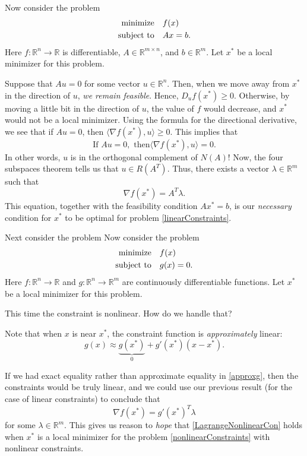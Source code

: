 \documentclass{article}
\DeclareMathOperator*{\minimize}{minimize}
\begin{document}
Now consider the problem
\begin{align}
\label{linearConstraints} \minimize & \quad f(x) \\
\notag \text{subject to} & \quad Ax = b.
\end{align}
Here $f:\mathbb R^n \to \mathbb R$ is differentiable, $A \in \mathbb R^{m \times n}$, and $b \in \mathbb R^m$.
Let $x^*$ be a local minimizer for this problem.

Suppose that $Au = 0$ for some vector $u \in \mathbb R^n$.  Then,
when we move away from $x^*$ in the direction of $u$, \emph{we remain feasible}.
Hence, $D_u f(x^*) \geq 0$.  Otherwise, by moving a little bit in the direction of $u$,
the value of $f$ would decrease, and $x^*$ would not be a local minimizer.
Using the formula for the directional derivative, we see that
if $Au = 0$, then $\langle \nabla f(x^*), u \rangle \geq 0$.
This implies that 
\begin{equation*}
\text{If } Au = 0, \text{ then} \langle \nabla f(x^*), u \rangle = 0.
\end{equation*}
In other words, $u$ is in the orthogonal complement of $N(A)$!
Now, the four subspaces theorem tells us that
$u \in R(A^T)$.  Thus, there exists a vector $\lambda \in \mathbb R^m$ such that
\begin{equation}
\label{LagrangeLinCon} \nabla f(x^*) = A^T \lambda.
\end{equation}
This equation, together with the feasibility condition $Ax^* = b$,
is our \emph{necessary} condition for $x^*$ to be optimal for problem \eqref{linearConstraints}.

Next consider the problem 
Now consider the problem
\begin{align}
\label{nonlinearConstraints} \minimize & \quad f(x) \\
\notag \text{subject to} & \quad g(x) = 0.
\end{align}
Here $f:\mathbb R^n \to \mathbb R$ and $g:\mathbb R^n \to \mathbb R^m$ are continuously
differentiable functions.
Let $x^*$ be a local minimizer for this problem.

This time the constraint is nonlinear.  How do we handle that?

Note that when $x$ is near $x^*$, the constraint function is \emph{approximately} linear:
\begin{equation}
\label{approxg} g(x) \approx \underbrace{g(x^*)}_{0} + g'(x^*) (x - x^*).
\end{equation}

If we had exact equality rather than approximate equality in \eqref{approxg},
then the constraints would be truly linear, and we could use our previous
result (for the case of linear constraints) to conclude that
\begin{equation}
\label{LagrangeNonlinearCon} \nabla f(x^*) = g'(x^*)^T \lambda
\end{equation}
for some $\lambda \in \mathbb R^m$.
This gives us reason to \emph{hope} that \eqref{LagrangeNonlinearCon}
holds when $x^*$ is a local minimizer for the problem \eqref{nonlinearConstraints}
with nonlinear constraints.
\end{document}
